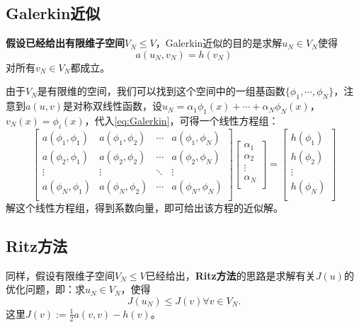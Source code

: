 \documentclass[lang=cn,10pt,newtx]{elegantbook}
\begin{document}
\subsection{Galerkin近似}
\textbf{假设已经给出有限维子空间}$V_{N}\le V$，Galerkin近似的目的是求解$u_{N}\in V_{N}$使得
\begin{equation}
  \label{eq:Galerkin}
  a(u_{N},v_{N})=h(v_{N})
\end{equation}
对所有$v_{N}\in V_{N}$都成立。

由于$V_{N}$是有限维的空间，我们可以找到这个空间中的一组基函数$\{\phi_{1},\cdots,\phi_{N}\}$，注意到$a(u,v)$是对称双线性函数，设$u_{N}=\alpha_{1}\phi_{1}(x)+\cdots+\alpha_{N}\phi_{N}(x)$，$v_{N}(x)=\phi_{i}(x)$，代入\eqref{eq:Galerkin}，可得一个线性方程组：
\begin{equation}
  \label{eq:LinearSystem}
  \begin{bmatrix}
    a(\phi_{1},\phi_{1})&a(\phi_{1},\phi_{2})&\cdots&a(\phi_{1},\phi_{N})\\
    a(\phi_{2},\phi_{1})&a(\phi_{2},\phi_{2})&\cdots&a(\phi_{2},\phi_{N})\\
    \vdots&\vdots&\ddots&\vdots\\
    a(\phi_{N},\phi_{1})&a(\phi_{N},\phi_{2})&\cdots&a(\phi_{N},\phi_{N})\\
  \end{bmatrix}
  \begin{bmatrix}
    \alpha_{1}\\
    \alpha_{2}\\
    \vdots\\
    \alpha_{N}\\
  \end{bmatrix}
  =\begin{bmatrix}
    h(\phi_{1})\\
    h(\phi_{2})\\
    \vdots\\
    h(\phi_{N})\\
  \end{bmatrix}
\end{equation}
解这个线性方程组，得到系数向量，即可给出该方程的近似解。

\subsection{Ritz方法}
同样，假设有限维子空间$V_{N}\le V$已经给出，\textbf{Ritz方法}的思路是求解有关$J(u)$的优化问题，即：求$u_{N}\in V_{N}$，使得
\begin{equation}
J(u_{N})\le J(v)\forall v\in V_{N}.
\end{equation}
这里$J(v):=\frac{1}{2}a(v,v)-h(v)$。
\end{document}
